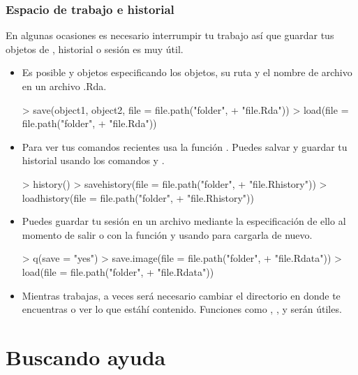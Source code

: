 \begin{frame}
  \frametitle{Espacio de trabajo e historial}
  En algunas ocasiones es necesario interrumpir tu trabajo as\'i que guardar tus objetos de , historial o sesi\'on es muy \'util.
  \begin{itemize}
  \item Es posible  y  objetos especificando los objetos, su ruta y el nombre de archivo en un archivo \alert{.Rda}.
\begin{Schunk}
\begin{Sinput}
> save(object1, object2, file = file.path("folder", 
+     "file.Rda"))
> load(file = file.path("folder", 
+     "file.Rda"))
\end{Sinput}
\end{Schunk}
  \item Para ver tus comandos recientes usa la funci\'on . Puedes salvar y guardar tu historial usando los comandos  y .
\begin{Schunk}
\begin{Sinput}
> history()
> savehistory(file = file.path("folder", 
+     "file.Rhistory"))
> loadhistory(file = file.path("folder", 
+     "file.Rhistory"))
\end{Sinput}
\end{Schunk}
  \item Puedes guardar tu sesi\'on en un archivo mediante la especificaci\'on de ello al momento de salir o con la funci\'on  y usando  para cargarla de nuevo.
\begin{Schunk}
\begin{Sinput}
> q(save = "yes")
> save.image(file = file.path("folder", 
+     "file.Rdata"))
> load(file = file.path("folder", 
+     "file.Rdata"))
\end{Sinput}
\end{Schunk}
  \item Mientras trabajas, a veces ser\'a necesario cambiar el directorio en donde te encuentras o ver lo que est\' ah\'i contenido. Funciones como , ,  y  ser\'an \'utiles.
  \end{itemize}
\end{frame}

\section{Buscando ayuda}

